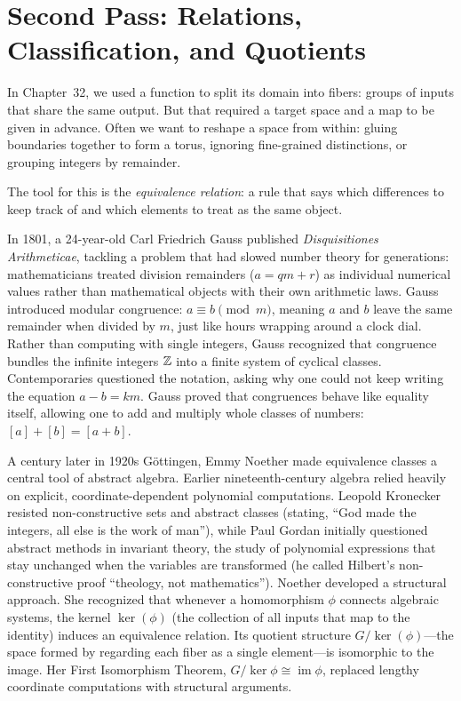 \section{Second Pass: Relations, Classification, and Quotients}
\chapterline

In Chapter~32, we used a function to split its domain into fibers: groups of inputs that share the same output. But that required a target space and a map to be given in advance. Often we want to reshape a space from within: gluing boundaries together to form a torus, ignoring fine-grained distinctions, or grouping integers by remainder.

The tool for this is the \emph{equivalence relation}: a rule that says which differences to keep track of and which elements to treat as the same object.

\begin{historybox}
In 1801, a 24-year-old Carl Friedrich Gauss published \emph{Disquisitiones Arithmeticae}, tackling a problem that had slowed number theory for generations: mathematicians treated division remainders ($a = qm + r$) as individual numerical values rather than mathematical objects with their own arithmetic laws. Gauss introduced modular congruence: $a \equiv b \pmod m$, meaning $a$ and $b$ leave the same remainder when divided by $m$, just like hours wrapping around a clock dial. Rather than computing with single integers, Gauss recognized that congruence bundles the infinite integers $\mathbb{Z}$ into a finite system of cyclical classes. Contemporaries questioned the notation, asking why one could not keep writing the equation $a - b = km$. Gauss proved that congruences behave like equality itself, allowing one to add and multiply whole classes of numbers: $[a] + [b] = [a+b]$.

A century later in 1920s G\"ottingen, Emmy Noether made equivalence classes a central tool of abstract algebra. Earlier nineteenth-century algebra relied heavily on explicit, coordinate-dependent polynomial computations. Leopold Kronecker resisted non-constructive sets and abstract classes (stating, ``God made the integers, all else is the work of man''), while Paul Gordan initially questioned abstract methods in invariant theory, the study of polynomial expressions that stay unchanged when the variables are transformed (he called Hilbert's non-constructive proof ``theology, not mathematics''). Noether developed a structural approach. She recognized that whenever a homomorphism $\phi$ connects algebraic systems, the kernel $\ker(\phi)$ (the collection of all inputs that map to the identity) induces an equivalence relation. Its quotient structure $G/\ker(\phi)$---the space formed by regarding each fiber as a single element---is isomorphic to the image. Her First Isomorphism Theorem, $G/\ker\phi \cong \operatorname{im}\phi$, replaced lengthy coordinate computations with structural arguments.


\end{historybox}
